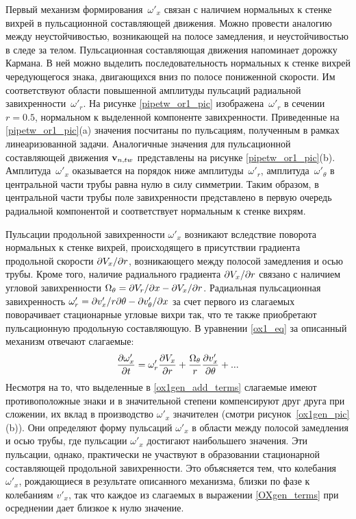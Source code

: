 Первый механизм формирования~$\omega'_x$ связан с наличием нормальных к стенке вихрей в пульсационной составляющей движения. Можно провести аналогию между неустойчивостью, возникающей на полосе замедления, и неустойчивостью в следе за телом. Пульсационная составляющая движения напоминает дорожку Кармана. В ней можно выделить последовательность нормальных к стенке вихрей чередующегося знака, двигающихся вниз по полосе пониженной скорости. Им соответствуют области повышенной амплитуды пульсаций радиальной завихренности~$\omega'_r$. На рисунке \ref{pipetw_or1_pic} изображена~$\omega'_r$ в сечении $r = 0.5$, нормальном к выделенной компоненте завихренности. Приведенные на \ref{pipetw_or1_pic}(a) значения посчитаны по пульсациям, полученным в рамках линеаризованной задачи. Аналогичные значения для пульсационной составляющей движения $\mathbf{v}_{n,tw}$ представлены на рисунке \ref{pipetw_or1_pic}(b). Амплитуда~$\omega'_x$ оказывается на порядок ниже амплитуды~$\omega'_r$, амплитуда~$\omega'_\theta$ в центральной части трубы равна нулю в силу симметрии. Таким образом, в центральной части трубы поле завихренности представлено в первую очередь радиальной компонентой и соответствует нормальным к стенке вихрям.

Пульсации продольной завихренности $\omega'_x$ возникают вследствие поворота нормальных к стенке вихрей, происходящего в присутствии градиента продольной скорости $\partial V_x/ \partial r$, возникающего между полосой замедления и осью трубы. Кроме того, наличие радиального градиента $\partial V_x/ \partial r$ связано с наличием угловой завихренности $\Omega_\theta = \partial V_r / \partial x - \partial V_x / \partial r$. Радиальная пульсационная завихренность $\omega'_r = \partial v'_x / r \partial \theta - \partial v'_\theta / \partial x$ за счет первого из слагаемых поворачивает стационарные угловые вихри так, что те также приобретают пульсационную продольную составляющую. В уравнении \eqref{ox1_eq} за описанный механизм отвечают слагаемые:
\begin{equation}\label{ox1gen_add_terms}
\frac{\partial \omega'_x}{\partial t} = \omega'_r \frac {\partial V_x}{\partial r} + \frac{\Omega_\theta}{r} \frac{\partial v'_x}{\partial \theta} + ...
\end{equation}
Несмотря на то, что выделенные в \eqref{ox1gen_add_terms} слагаемые имеют противоположные знаки и в значительной степени компенсируют друг друга при сложении, их вклад в производство $\omega'_x$ значителен (смотри рисунок~\ref{ox1gen_pic}(b)). Они определяют форму пульсаций $\omega'_x$ в области между полосой замедления и осью трубы, где пульсации $\omega'_x$ достигают наибольшего значения. Эти пульсации, однако, практически не участвуют в образовании стационарной составляющей продольной завихренности. Это объясняется тем, что колебания $\omega'_x$, рождающиеся в результате описанного механизма, близки по фазе к колебаниям $v'_x$, так что каждое из слагаемых в выражении \eqref{OXgen_terms} при осреднении дает близкое к нулю значение.

